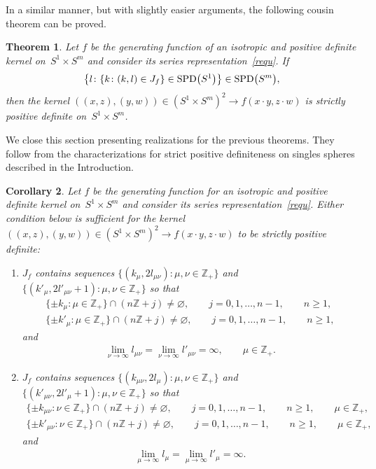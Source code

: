 \documentclass[pdftex]{sigma}
\numberwithin{equation}{section}
\newtheorem{Theorem}{Theorem}[section]
\newtheorem{Corollary}[Theorem]{Corollary}
\begin{document}
In a similar manner, but with slightly easier arguments, the following cousin theorem can be proved.

\begin{Theorem}
Let $f$ be the generating function of an isotropic and positive definite kernel on~\mbox{$S^1 \times S^m$} and consider its series representation~\eqref{requ}. If
\begin{gather*}\big\{l\colon \{k\colon (k,l)\in J_f\} \in {\rm SPD}\big(S^1\big)\big\} \in {\rm SPD}\big(S^m\big),\end{gather*}
then the kernel $((x,z), (y,w)) \in (S^1 \times S^m)^2 \to f(x \cdot y, z \cdot w)$ is strictly positive definite on~$S^1\times S^m$.
\end{Theorem}

We close this section presenting realizations for the previous theorems. They follow from the characterizations for strict positive def\/initeness on singles spheres described in the Introduction.

\begin{Corollary}
Let $f$ be the generating function for an isotropic and positive definite kernel on~\mbox{$S^1 \times S^m$} and consider its series representation~\eqref{requ}. Either condition below is sufficient for the kernel $((x,z), (y,w)) \in (S^1 \times S^m)^2 \to f(x \cdot y, z \cdot w)$ to be strictly positive definite:
\begin{enumerate}\itemsep=0pt
\item[$(i)$] $J_f$ contains sequences $\{(k_\mu, 2l_{\mu\nu})\colon \mu,\nu \in \mathbb{Z}_+\}$ and $\{(k'_\mu, 2l'_{\mu\nu}+1)\colon \mu,\nu \in \mathbb{Z}_+\}$ so that
\begin{gather*}\{\pm k_\mu\colon \mu\in \mathbb{Z}_+\} \cap (n\mathbb{Z}+j)\neq \varnothing, \qquad j=0,1,\ldots,n-1, \qquad n\geq 1,\\
\{\pm k'_\mu\colon \mu\in \mathbb{Z}_+\} \cap (n\mathbb{Z}+j)\neq \varnothing, \qquad j=0,1,\ldots,n-1, \qquad n\geq 1,\end{gather*}
and
\begin{gather*}\lim_{\nu \to \infty} l_{\mu\nu}=\lim_{\nu \to \infty} l'_{\mu\nu}=\infty, \qquad \mu\in \mathbb{Z}_+.\end{gather*}
\item[$(ii)$] $J_f$ contains sequences $\{(k_{\mu\nu}, 2l_{\mu})\colon \mu,\nu \in \mathbb{Z}_+\}$ and $\{(k'_{\mu\nu}, 2l'_{\mu}+1)\colon \mu,\nu \in \mathbb{Z}_+\}$ so that
\begin{gather*}\{\pm k_{\mu\nu}\colon \nu\in \mathbb{Z}_+\} \cap (n\mathbb{Z}+j)\neq \varnothing, \qquad j=0,1,\ldots,n-1,\qquad n\geq 1, \qquad \mu \in \mathbb{Z}_+,\\
\{\pm k'_{\mu\nu}\colon \nu\in \mathbb{Z}_+\} \cap (n\mathbb{Z}+j)\neq \varnothing, \qquad j=0,1,\ldots,n-1, \qquad n\geq 1, \qquad \mu \in \mathbb{Z}_+,\end{gather*}
and
\begin{gather*}\lim_{\mu \to \infty} l_{\mu}=\lim_{\mu \to \infty} l'_{\mu}=\infty. \end{gather*}
\end{enumerate}
\end{Corollary}
\end{document}
